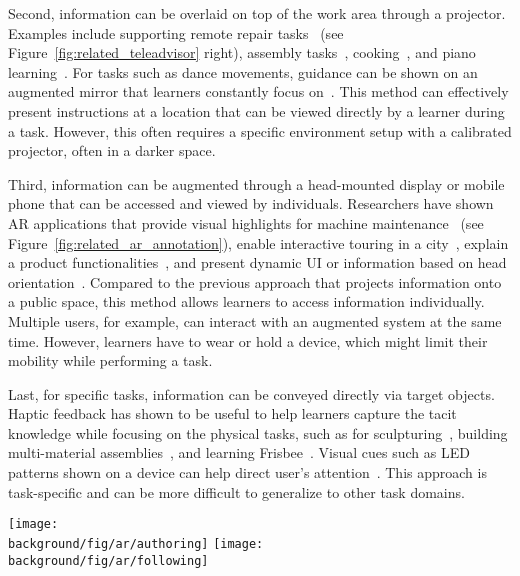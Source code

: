 Second, information can be overlaid on top of the work area through a projector. Examples include supporting remote repair tasks~\cite{Gurevich:2012ko} (see Figure~\ref{fig:related_teleadvisor} right), assembly tasks~\cite{Kirk:2006:CRG:1124772.1124951}, cooking~\cite{Ju:2001:CIC:634067.634227}, and piano learning~\cite{Xiao:2016:IEI:2858036.2858577}.
%
For tasks such as dance movements, guidance can be shown on an augmented mirror that learners constantly focus on~\cite{Anderson:2013:YEM:2501988.2502045}.
%
This method can effectively present instructions at a location that can be viewed directly by a learner during a task. However, this often requires a specific environment setup with a calibrated projector, often in a darker space.

Third, information can be augmented through a head-mounted display or mobile phone that can be accessed and viewed by individuals. Researchers have shown AR applications that provide visual highlights for machine maintenance~\cite{Henderson:2011ff,Mohr:2015:RTD:2702123.2702490} (see Figure~\ref{fig:related_ar_annotation}), enable interactive touring in a city~\cite{Feiner1997}, explain a product functionalities~\cite{MagicLens}, and present dynamic UI or information based on head orientation~\cite{Zhang:2014:HHO:2659766.2659773}.
%
Compared to the previous approach that projects information onto a public space, this method allows learners to access information individually. Multiple users, for example, can interact with an augmented system at the same time. However, learners have to wear or hold a device, which might limit their mobility while performing a task.

Last, for specific tasks, information can be conveyed directly via target objects. Haptic feedback has shown to be useful to help learners capture the tacit knowledge while focusing on the physical tasks, such as for sculpturing~\cite{Zoran:2013:FFD:2470654.2481361,Agrawal:2015:PPS:2807442.2807505}, building multi-material assemblies~\cite{Schoop:2016:DSS:2851581.2892429}, and learning Frisbee~\cite{Solomon:2014:UTI:2540930.2540965}. Visual cues such as LED patterns shown on a device can help direct user's attention~\cite{Solomon:2014:UTI:2540930.2540965,Vasey:2016:HHR:2897839.2927404}.
%
This approach is task-specific and can be more difficult to generalize to other task domains.

\begin{figure*}[t!]
  \centering
  \texttt{[image: \\background/fig/ar/authoring]}
  \texttt{[image: \\background/fig/ar/following]}
  \caption{TeleAdvisor~\cite{Gurevich:2012ko} provides an authoring interface (left) for an instructor to guide a remote worker through a repair task (right).}
  \label{fig:related_teleadvisor}
\end{figure*}

